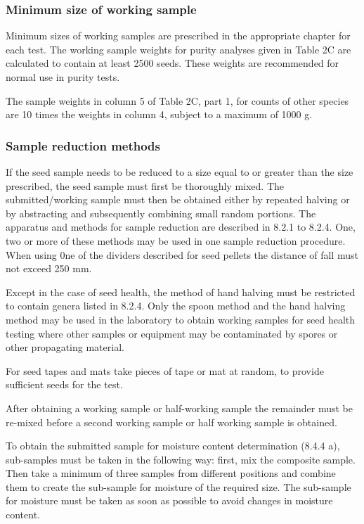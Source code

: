 \documentclass[
]{book}
\begin{document}
\hypertarget{minimum-size-of-working-sample}{%
\subsubsection{Minimum size of working sample}\label{minimum-size-of-working-sample}}

Minimum sizes of working samples are prescribed in the appropriate chapter for each test. The working sample weights for purity analyses given in Table 2C are calculated to contain at least 2500 seeds. These weights are recommended for normal use in purity tests.

The sample weights in column 5 of Table 2C, part 1, for counts of other species are 10 times the weights in column 4, subject to a maximum of 1000 g.

\hypertarget{sample-reduction-methods}{%
\subsubsection{Sample reduction methods}\label{sample-reduction-methods}}

If the seed sample needs to be reduced to a size equal to or greater than the size prescribed, the seed sample must first be thoroughly mixed. The submitted/working sample must then be obtained either by repeated halving or by abstracting and subsequently combining small random portions. The apparatus and methods for sample reduction are described in 8.2.1 to 8.2.4. One, two or more of these methods may be used in one sample reduction procedure. When using 0ne of the dividers described for seed pellets the distance of fall must not exceed 250 mm.

Except in the case of seed health, the method of hand halving must be restricted to contain genera listed in 8.2.4. Only the spoon method and the hand halving method may be used in the laboratory to obtain working samples for seed health testing where other samples or equipment may be contaminated by spores or other propagating material.

For seed tapes and mats take pieces of tape or mat at random, to provide sufficient seeds for the test.

After obtaining a working sample or half-working sample the remainder must be re-mixed before a second working sample or half working sample is obtained.

To obtain the submitted sample for moisture content determination (8.4.4 a), sub-samples must be taken in the following way: first, mix the composite sample. Then take a minimum of three samples from different positions and combine them to create the sub-sample for moisture of the required size. The sub-sample for moisture must be taken as soon as possible to avoid changes in moisture content.
\end{document}
